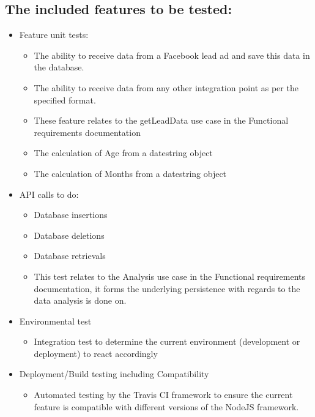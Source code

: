 \documentclass{article}
\begin{document}
\subsection{The included features to be tested:}
\begin{itemize}
\item Feature unit tests:
	\begin{itemize}
	\item The ability to receive data from a Facebook lead ad and save this data in the database.
	\item The ability to receive data from any other integration point as per the specified format.
	\item These feature relates to the getLeadData use case in the Functional requirements documentation
	\item The calculation of Age from a datestring object
	\item The calculation of Months from a datestring object
	\end{itemize}
	
\item API calls to do:
	\begin{itemize}
	\item Database insertions 
	\item Database deletions 
	\item Database retrievals 
	\item This test relates to the Analysis use case in the Functional requirements documentation, it forms the underlying persistence with regards to the data analysis is done on.
	\end{itemize}
\item Environmental test
	\begin{itemize}
	\item Integration test to determine the current environment (development or deployment) to react accordingly 
	\end{itemize}
\item Deployment/Build testing including Compatibility
		\begin{itemize}
	\item Automated testing by the Travis CI framework to ensure the current feature is compatible with different versions of the NodeJS framework. 
	\end{itemize}
\end{itemize}
\end{document}
